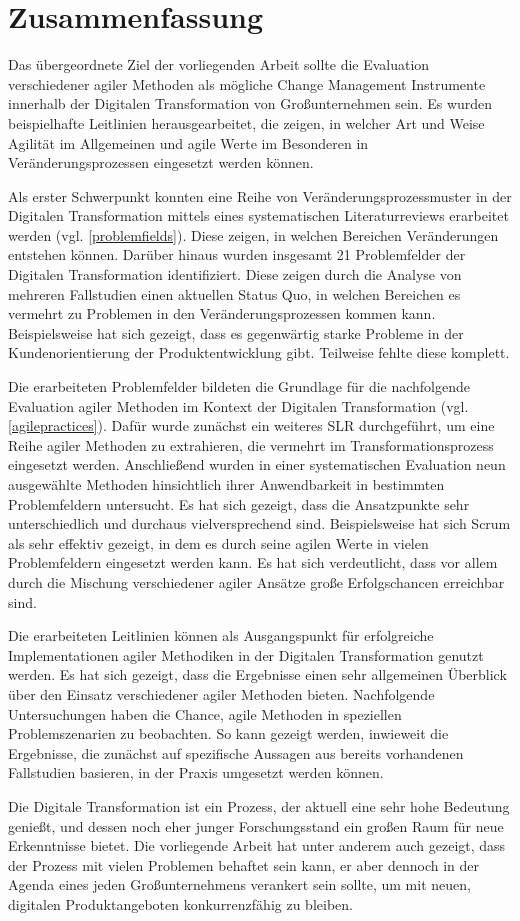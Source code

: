 \chapter{Zusammenfassung}
\label{conclusion}

Das übergeordnete Ziel der vorliegenden Arbeit sollte die Evaluation verschiedener agiler Methoden als mögliche Change Management Instrumente innerhalb der Digitalen Transformation von Großunternehmen sein. Es wurden beispielhafte Leitlinien herausgearbeitet, die zeigen, in welcher Art und Weise Agilität im Allgemeinen und agile Werte im Besonderen in Veränderungsprozessen eingesetzt werden können.

Als erster Schwerpunkt konnten eine Reihe von Veränderungsprozessmuster in der Digitalen Transformation mittels eines systematischen Literaturreviews erarbeitet werden (vgl. \ref{problemfields}). Diese zeigen, in welchen Bereichen Veränderungen entstehen können. Darüber hinaus wurden insgesamt 21 Problemfelder der Digitalen Transformation identifiziert. Diese zeigen durch die Analyse von mehreren Fallstudien einen aktuellen Status Quo, in welchen Bereichen es vermehrt zu Problemen in den Veränderungsprozessen kommen kann. Beispielsweise hat sich gezeigt, dass es gegenwärtig starke Probleme in der Kundenorientierung der Produktentwicklung gibt. Teilweise fehlte diese komplett.

Die erarbeiteten Problemfelder bildeten die Grundlage für die nachfolgende Evaluation agiler Methoden im Kontext der Digitalen Transformation (vgl.  \ref{agilepractices}). Dafür wurde zunächst ein weiteres SLR durchgeführt, um eine Reihe agiler Methoden zu extrahieren, die vermehrt im Transformationsprozess eingesetzt werden. Anschließend wurden in einer systematischen Evaluation neun ausgewählte Methoden hinsichtlich ihrer Anwendbarkeit in bestimmten Problemfeldern untersucht. Es hat sich gezeigt, dass die Ansatzpunkte sehr unterschiedlich und durchaus vielversprechend sind. Beispielsweise hat sich Scrum als sehr effektiv gezeigt, in dem es durch seine agilen Werte in vielen Problemfeldern eingesetzt werden kann. Es hat sich verdeutlicht, dass vor allem durch die Mischung verschiedener agiler Ansätze große Erfolgschancen erreichbar sind.

Die erarbeiteten Leitlinien können als Ausgangspunkt für erfolgreiche Implementationen agiler Methodiken in der Digitalen Transformation genutzt werden. Es hat sich gezeigt, dass die Ergebnisse einen sehr allgemeinen Überblick über den Einsatz verschiedener agiler Methoden bieten. Nachfolgende Untersuchungen haben die Chance, agile Methoden in speziellen Problemszenarien zu beobachten. So kann gezeigt werden, inwieweit die Ergebnisse, die zunächst auf spezifische Aussagen aus bereits vorhandenen Fallstudien basieren, in der Praxis umgesetzt werden können. 

Die Digitale Transformation ist ein Prozess, der aktuell eine sehr hohe Bedeutung genießt, und dessen noch eher junger Forschungsstand ein großen Raum für neue Erkenntnisse bietet. Die vorliegende Arbeit hat unter anderem auch gezeigt, dass der Prozess mit vielen Problemen behaftet sein kann, er aber dennoch in der Agenda eines jeden Großunternehmens verankert sein sollte, um mit neuen, digitalen Produktangeboten konkurrenzfähig zu bleiben.